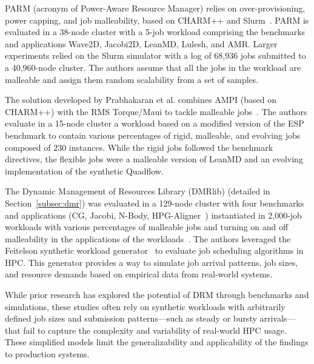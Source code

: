 \documentclass[a4paper,fleqn]{cas-dc}
\begin{document}
PARM (acronym of Power-Aware Resource Manager) relies on over-provisioning, power capping, and job malleability, based on CHARM++ and Slurm~\cite{sarood_maximizing_2014}.
PARM is evaluated in a 38-node cluster with a 5-job workload comprising the benchmarks and applications Wave2D, Jacobi2D, LeanMD, Lulesh, and AMR.
Larger experiments relied on the Slurm simulator with a log of 68,936 jobs submitted to a 40,960-node cluster. The authors assume that all the jobs in the workload are malleable and assign them random scalability from a set of samples.

The solution developed by Prabhakaran et al. combines AMPI (based on CHARM++) with the RMS Torque/Maui to tackle malleable jobs~\cite{sarood_maximizing_2014}. 
The authors evaluate in a 15-node cluster a workload based on a modified version of the ESP benchmark to contain various percentages of rigid, malleable, and evolving jobs composed of 230 instances.
While the rigid jobs followed the benchmark directives, the flexible jobs were a malleable version of LeanMD and an evolving implementation of the synthetic Quadflow.

The Dynamic Management of Resources Library (DMRlib) (detailed in Section~\ref{subsec:dmr}) was evaluated in a 129-node cluster with four benchmarks and applications (CG, Jacobi, N-Body, HPG-Aligner~\cite{iserte_dynamic_2019}) instantiated in 2,000-job workloads with various percentages of malleable jobs and turning on and off malleability in the applications of the workloads~\cite{iserte_dmrlib_2020}.
The authors leveraged the Feitelson synthetic workload generator~\cite{feitelson_towards_1996} to evaluate job scheduling algorithms in HPC.
This generator provides a way to simulate job arrival patterns, job sizes, and resource demands based on empirical data from real-world systems.



While prior research has explored the potential of DRM through benchmarks and simulations, these studies often rely on synthetic workloads with arbitrarily defined job sizes and submission patterns—such as steady or bursty arrivals—that fail to capture the complexity and variability of real-world HPC usage. These simplified models limit the generalizability and applicability of the findings to production systems.
\end{document}

